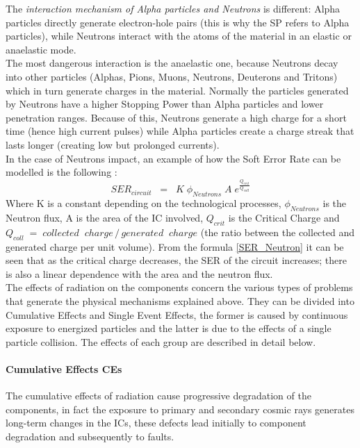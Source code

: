 {{{{				The\textit{ interaction mechanism of Alpha particles and Neutrons} is different: Alpha particles directly generate electron-hole pairs (this is why the SP refers to Alpha particles), while Neutrons interact with the atoms of the material in an elastic or anaelastic mode. \\
				
				The most dangerous interaction is the anaelastic one, because Neutrons decay into other particles (Alphas, Pions, Muons, Neutrons, Deuterons and Tritons) which in turn generate charges in the material. Normally the particles generated by Neutrons have a higher Stopping Power than Alpha particles and lower penetration ranges. Because of this, Neutrons generate a high charge for a short time (hence high current pulses) while Alpha particles create a charge streak that lasts longer (creating low but prolonged currents).\\
				
				In the case of Neutrons impact, an example of how the Soft Error Rate can be modelled is the following :
				\begin{equation} \label{SER_Neutron}
				SER_{circuit}\;\;= \;\;K\;\phi_{Neutrons}\;A\;e^{\frac{Q_{crit}}{Q_{coll}}}
				\end{equation}
				Where K is a constant depending on the technological processes, $\phi_{Neutrons}$ is the Neutron flux, A is the area of the IC involved, $Q_{crit}$ is the Critical Charge and $Q_{coll}\;=\;collected\;\;charge\,/\,generated\;\;charge$ (the ratio between the collected and generated charge per unit volume). From the formula \ref{SER_Neutron} it can be seen that as the critical charge decreases, the SER of the circuit increases; there is also a linear dependence with the area and the neutron flux.\\
				
				The effects of radiation on the components concern the various types of problems that generate the physical mechanisms explained above. They can be divided into Cumulative Effects and Single Event Effects, the former is caused by continuous exposure to energized particles and the latter is due to the effects of a single particle collision. The effects of each group are described in detail below.
			
				\paragraph{Cumulative Effects CEs}{
					The cumulative effects of radiation cause progressive degradation of the components, in fact the exposure to primary and secondary cosmic rays generates long-term changes in the ICs, these defects lead initially to component degradation and subsequently to faults.
					
}}}}}
